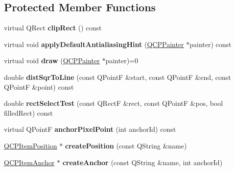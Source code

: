 \subsection*{Protected Member Functions}
\begin{DoxyCompactItemize}
\item 
\hypertarget{classQCPAbstractItem_a538e25ff8856534582f5b2b400a46405}{virtual Q\-Rect {\bfseries clip\-Rect} () const }\label{classQCPAbstractItem_a538e25ff8856534582f5b2b400a46405}

\item 
\hypertarget{classQCPAbstractItem_a0839031abdd71067e2256a4d53c7a011}{virtual void {\bfseries apply\-Default\-Antialiasing\-Hint} (\hyperlink{classQCPPainter}{Q\-C\-P\-Painter} $\ast$painter) const }\label{classQCPAbstractItem_a0839031abdd71067e2256a4d53c7a011}

\item 
\hypertarget{classQCPAbstractItem_ad0dc056f650c3ca73414e6b4f01674ef}{virtual void {\bfseries draw} (\hyperlink{classQCPPainter}{Q\-C\-P\-Painter} $\ast$painter)=0}\label{classQCPAbstractItem_ad0dc056f650c3ca73414e6b4f01674ef}

\item 
\hypertarget{classQCPAbstractItem_acdca343717d625b8abb3c3e38c0ed39d}{double {\bfseries dist\-Sqr\-To\-Line} (const Q\-Point\-F \&start, const Q\-Point\-F \&end, const Q\-Point\-F \&point) const }\label{classQCPAbstractItem_acdca343717d625b8abb3c3e38c0ed39d}

\item 
\hypertarget{classQCPAbstractItem_a4c0e14c4e92df91174cb7183fb363069}{double {\bfseries rect\-Select\-Test} (const Q\-Rect\-F \&rect, const Q\-Point\-F \&pos, bool filled\-Rect) const }\label{classQCPAbstractItem_a4c0e14c4e92df91174cb7183fb363069}

\item 
\hypertarget{classQCPAbstractItem_a94bde62b8a2fc133666dcbb8035deeed}{virtual Q\-Point\-F {\bfseries anchor\-Pixel\-Point} (int anchor\-Id) const }\label{classQCPAbstractItem_a94bde62b8a2fc133666dcbb8035deeed}

\item 
\hypertarget{classQCPAbstractItem_a75036d39c4d4e2e1a7dd145fff915d32}{\hyperlink{classQCPItemPosition}{Q\-C\-P\-Item\-Position} $\ast$ {\bfseries create\-Position} (const Q\-String \&name)}\label{classQCPAbstractItem_a75036d39c4d4e2e1a7dd145fff915d32}

\item 
\hypertarget{classQCPAbstractItem_af3fc92527802078ca395138748b629a7}{\hyperlink{classQCPItemAnchor}{Q\-C\-P\-Item\-Anchor} $\ast$ {\bfseries create\-Anchor} (const Q\-String \&name, int anchor\-Id)}\label{classQCPAbstractItem_af3fc92527802078ca395138748b629a7}

\end{DoxyCompactItemize}
